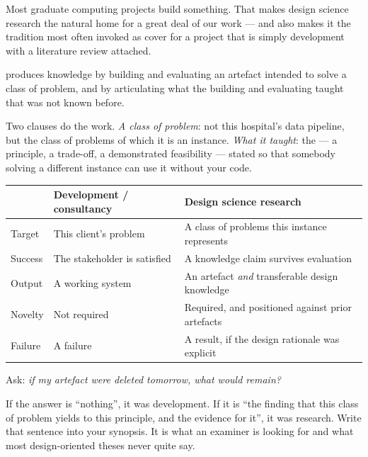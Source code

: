Most graduate computing projects build something. That makes design science
research the natural home for a great deal of our work --- and also makes it
the tradition most often invoked as cover for a project that is simply
development with a literature review attached.

\begin{definitionbox}
 produces knowledge by building and evaluating an
artefact intended to solve a class of problem, and by articulating what the
building and evaluating taught that was not known before.

\medskip
Two clauses do the work. \emph{A class of problem}: not this hospital's data
pipeline, but the class of problems of which it is an instance. \emph{What it
taught}: the  --- a principle, a trade-off, a
demonstrated feasibility --- stated so that somebody solving a different
instance can use it without your code.
\end{definitionbox}

\begin{center}
\small
\begin{tabular}{@{}L{2.8cm}L{5.5cm}L{5.7cm}@{}}
\toprule
 & \textbf{Development / consultancy} & \textbf{Design science research} \\
\midrule
Target     & This client's problem
           & A class of problems this instance represents \\
Success    & The stakeholder is satisfied
           & A knowledge claim survives evaluation \\
Output     & A working system
           & An artefact \emph{and} transferable design knowledge \\
Novelty    & Not required
           & Required, and positioned against prior artefacts \\
Failure    & A failure
           & A result, if the design rationale was explicit \\
\bottomrule
\end{tabular}
\end{center}

\begin{alertbox}
Ask: \emph{if my artefact were deleted tomorrow, what would remain?}

\medskip
If the answer is ``nothing'', it was development. If it is ``the finding that
this class of problem yields to this principle, and the evidence for it'', it
was research. Write that sentence into your synopsis. It is what an examiner is
looking for and what most design-oriented theses never quite say.
\end{alertbox}

